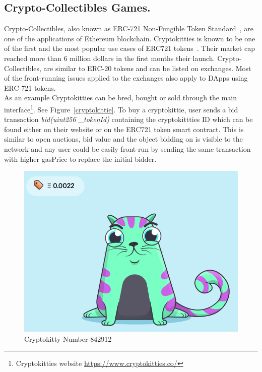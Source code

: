 


\subsection{Crypto-Collectibles Games.}

Crypto-Collectibles, also known as ERC-721 Non-Fungible Token Standard~\cite{erc721}, are one of the applications of Ethereum blockchain. Cryptokitties is known to be one of the first and the most popular use cases of ERC721 tokens~\cite{cryptokitties}. Their market cap reached more than 6 million dollars in the first months their launch. Crypto-Collectibles, are similar to ERC-20 tokens and can be listed on exchanges. Most of the front-running issues applied to the exchanges also apply to DApps using ERC-721 tokens. \\

As an example Cryptokitties can be bred, bought or sold through the main interface\footnote{Cryptokitties website \url{https://www.cryptokitties.co/}}. See Figure~\ref{cryptokittie}.
To buy a cryptokittie, user sends a bid transaction \textit{bid(uint256 \_tokenId)} containing the cryptokittties ID which can be found either on their website or on the ERC721 token smart contract. This is similar to open auctions, bid value and the object bidding on is visible to the network and any user could be easily front-run by sending the same transaction with higher gasPrice to replace the initial bidder. 


\begin{figure}[h]
\centering
\includegraphics[width=0.4\linewidth]{figures/cryptokittie842912.png}
\caption{ Cryptokitty Number 842912 \label{fig:cryptokittie}}
\end{figure}


